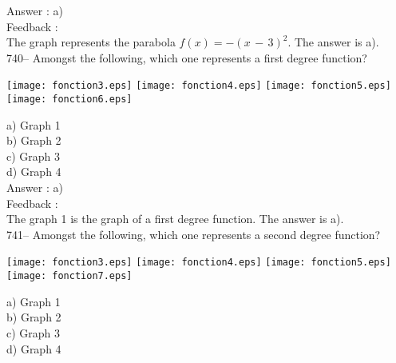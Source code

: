 \documentclass[letterpaper, 12pt]{article}
\begin{document}
Answer : a)\\

Feedback : \\
The graph represents the parabola $f(x)=-(x\,-\,3)^{2}$. The answer is a).  \\

740-- Amongst the following, which one represents a first degree function?\\
    \begin{center}
    \texttt{[image: fonction3.eps]}
\texttt{[image: fonction4.eps]}
\texttt{[image: fonction5.eps]}
\texttt{[image: fonction6.eps]}
    \end{center}
a) Graph 1\\
b) Graph 2\\
c) Graph 3\\
d) Graph 4\\

Answer : a)\\

Feedback : \\
The graph 1 is the graph of a first degree function. The answer is a).\\

741-- Amongst the following, which one represents a second degree function?\\
    \begin{center}
    \texttt{[image: fonction3.eps]}
\texttt{[image: fonction4.eps]}
\texttt{[image: fonction5.eps]}
\texttt{[image: fonction7.eps]}

    \end{center}
a) Graph 1\\
b) Graph 2\\
c) Graph 3\\
d) Graph 4\\
\end{document}
